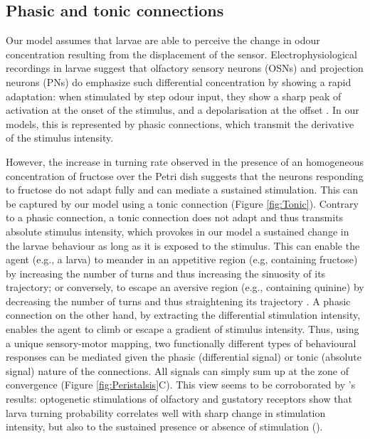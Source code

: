 \documentclass[11pt,a4paper]{article}
\begin{document}
\subsection{Phasic and tonic connections}
Our model assumes that larvae are able to perceive the change in odour concentration resulting from the displacement of the sensor. Electrophysiological recordings in larvae suggest that olfactory sensory neurons (OSNs) \citep{nagel2011biophysical,schulze2015dynamical} and projection neurons (PNs) do emphasize such differential concentration by showing a rapid adaptation: when stimulated by step odour input, they show a sharp peak of activation at the onset of the stimulus, and a depolarisation at the offset \citep{schulze2015dynamical}. In our models, this is represented by phasic connections, which transmit the derivative of the stimulus intensity.  

However, the increase in turning rate observed in the presence of an homogeneous concentration of fructose over the Petri dish \cite{schleyer2015learning} suggests that the neurons responding to fructose do not adapt fully and can mediate a sustained stimulation. This can be captured by our model using a tonic connection (Figure \ref{fig:Tonic}). Contrary to a phasic connection, a tonic connection does not adapt and thus transmits absolute stimulus intensity, which provokes in our model a sustained change in the larvae behaviour as long as it is exposed to the stimulus. This can enable the agent (e.g., a larva) to meander in an appetitive region (e.g, containing fructose) by increasing the number of turns and thus increasing the sinuosity of its trajectory; or conversely, to escape an aversive region (e.g., containing quinine) by decreasing the number of turns and thus straightening its trajectory \citep{benhamou1989animals}. A phasic connection on the other hand, by extracting the differential stimulation intensity, enables the agent to climb or escape a gradient of stimulus intensity. Thus, using a unique sensory-motor mapping, two functionally different types of behavioural responses can be mediated given the phasic (differential signal) or tonic (absolute signal) nature of the connections. All signals can simply sum up at the zone of convergence (Figure \ref{fig:Peristalsis}C). This view seems to be corroborated by \cite{hernandez2015reverse}'s results: optogenetic stimulations of olfactory and gustatory receptors show that larva turning probability correlates well with sharp change in stimulation intensity, but also to the sustained presence or absence of stimulation (\citep{gepner2015computations,hernandez2015reverse}).
\end{document}
